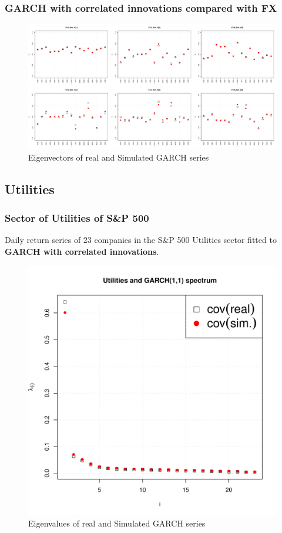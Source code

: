 \documentclass{beamer}
\begin{document}
\begin{frame}
  \frametitle{GARCH with correlated innovations compared with FX}
  \begin{figure}[htb!]
    \centering
    \includegraphics[scale=0.2]{FX_eigenvectors.pdf}
    \caption{\scriptsize Eigenvectors of real and Simulated GARCH series}
  \end{figure}
\end{frame}

  
\subsection{Utilities}
\begin{frame}
  \frametitle{Sector of Utilities of S\&P 500}
  Daily return series of 23 companies in the S\&P 500 Utilities sector
  fitted to {\bf GARCH with correlated innovations}.
  \begin{figure}[htb!]
    \centering
    \includegraphics[scale=0.35]{Utilities_eigenvalues.pdf}
    \caption{\scriptsize Eigenvalues of real and Simulated GARCH series}
  \end{figure}
\end{frame}
\end{document}
